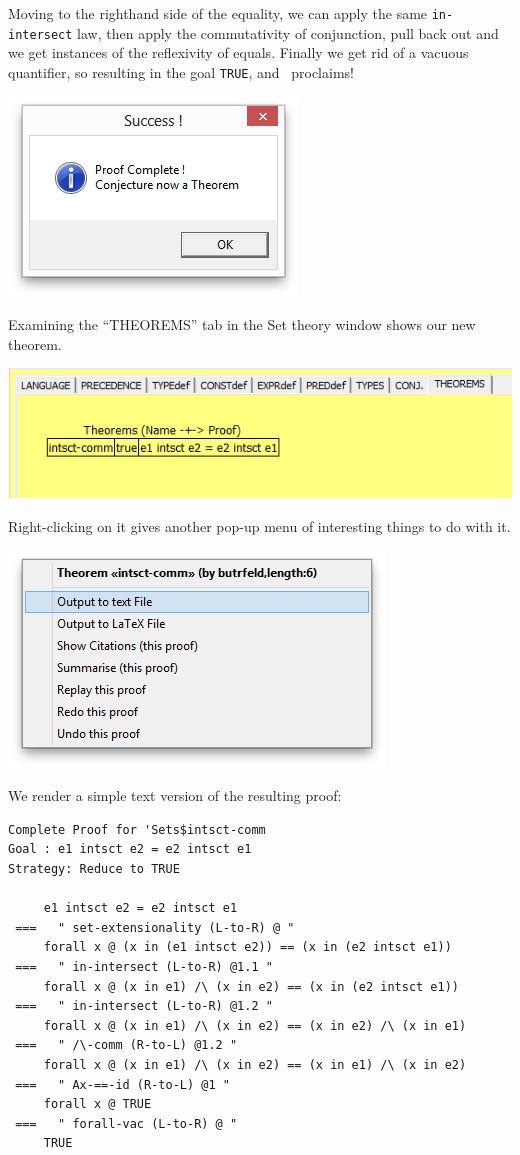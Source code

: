 \noindent
Moving to the righthand side of the equality, we can apply the same \texttt{in-intersect} law,
then apply the commutativity of conjunction, pull back out and we get
instances of the reflexivity of equals. Finally we get rid of a vacuous quantifier,
so resulting in the goal \texttt{TRUE}, and \ proclaims!

\includegraphics[scale=0.5]{17-proof-complete.png}

\noindent
Examining the ``THEOREMS'' tab in the Set theory window shows our new theorem.

\includegraphics[scale=0.5]{20-our-new-theorem.png}

\noindent
Right-clicking on it gives another pop-up menu of interesting things to do with it.

  \includegraphics[scale=0.5]{21-saving-text-version.png}

\noindent
We render a simple text version of the resulting proof:
\begin{verbatim}
Complete Proof for 'Sets$intsct-comm
Goal : e1 intsct e2 = e2 intsct e1
Strategy: Reduce to TRUE

     e1 intsct e2 = e2 intsct e1
 ===   " set-extensionality (L-to-R) @ "
     forall x @ (x in (e1 intsct e2)) == (x in (e2 intsct e1))
 ===   " in-intersect (L-to-R) @1.1 "
     forall x @ (x in e1) /\ (x in e2) == (x in (e2 intsct e1))
 ===   " in-intersect (L-to-R) @1.2 "
     forall x @ (x in e1) /\ (x in e2) == (x in e2) /\ (x in e1)
 ===   " /\-comm (R-to-L) @1.2 "
     forall x @ (x in e1) /\ (x in e2) == (x in e1) /\ (x in e2)
 ===   " Ax-==-id (R-to-L) @1 "
     forall x @ TRUE
 ===   " forall-vac (L-to-R) @ "
     TRUE
\end{verbatim}

